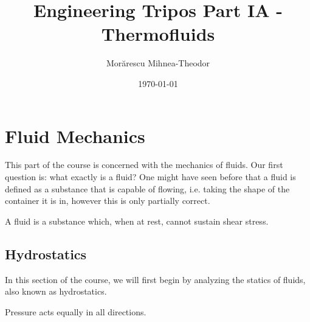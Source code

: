\documentclass{article}
\begin{document}
\title{Engineering Tripos Part IA - Thermofluids}
\author{Morărescu Mihnea-Theodor}
\date{\today}

\maketitle

\newpage

\tableofcontents

\newpage

\section{Fluid Mechanics}

This part of the course is concerned with the mechanics of fluids. Our first question is: what exactly is a fluid? One might have seen before that a fluid is defined as a substance that is capable of flowing, i.e. taking the shape of the container it is in, however this is only partially correct.

\begin{definition}[Fluid]
    A fluid is a substance which, when at rest, cannot sustain shear stress.
\end{definition}

\subsection{Hydrostatics}

In this section of the course, we will first begin by analyzing the statics of fluids, also known as hydrostatics.

\begin{theorem}
    Pressure acts equally in all directions.
\end{theorem}
\end{document}
